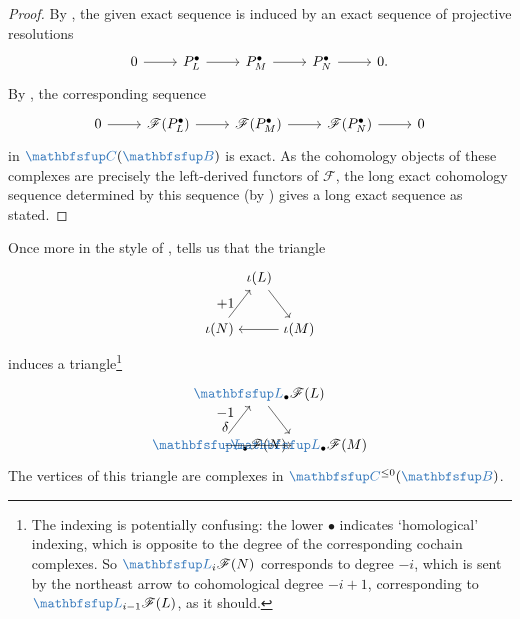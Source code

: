 \begin{proof}
  By , the given exact sequence is induced by
  an exact sequence of projective resolutions
  \[\begin{tikzcd}
      0 \arrow[r] & P_L^\bullet \arrow[r] & P_M^\bullet \arrow[r] &
      P_N^\bullet \arrow[r] & 0.
    \end{tikzcd}\] By , the corresponding
  sequence
  \[\begin{tikzcd}
      0 \arrow[r] & \mathscr{F}(P_L^\bullet) \arrow[r] &
      \mathscr{F}(P_M^\bullet) \arrow[r] & \mathscr{F}(P_N^\bullet)
      \arrow[r] & 0
    \end{tikzcd}\] in $\categ{C}(\categ{B})$ is exact. As the
  cohomology objects of these complexes are precisely the left-derived
  functors of $\mathscr{F}$, the long exact cohomology sequence
  determined by this sequence (by ) gives a long exact
  sequence as stated.
\end{proof}

Once more in the style of ,
 tells us that the triangle
\[
  \begin{tikzpicture}[baseline=(current bounding box.center)]
    \node (L) at (1,1.3)
    {$\iota(L)$}; \node (N) at (0,0)
    {$\iota(N)$}; \node (M) at (2,0)
    {$\iota(M)$}; \draw[->] (L) -- (M); \draw[->] (M) -- (N);
    \draw[->] (N) -- (L) node[midway, left] {$+1$};
  \end{tikzpicture}
\]
induces a triangle\footnote{The indexing is potentially confusing: the
  lower $\bullet$ indicates `homological' indexing, which is opposite
  to the degree of the corresponding cochain complexes. So
  $\categ{L}_i\mathscr{F}(N)$ corresponds to degree $-i$, which is
  sent by the northeast arrow to cohomological degree $-i+1$,
  corresponding to $\categ{L}_{i-1}\mathscr{F}(L)$, as it should.}
\[
  \begin{tikzpicture}[baseline=(current bounding box.center)]
    \node (L) at (1,1.3)
    {$\categ{L}_\bullet\mathscr{F}(L)$}; \node (N) at (0,0)
    {$\categ{L}_\bullet\mathscr{F}(N)$}; \node (M) at (2,0)
    {$\categ{L}_\bullet\mathscr{F}(M)$}; \draw[->] (L) -- (M);
    \draw[->] (M) -- (N); \draw[->] (N) -- (L) node[midway, left]
    {$\shortstack{$-1$ \\ $\delta$}$};
  \end{tikzpicture}
\]
The vertices of this triangle are complexes in
$\categ{C}^{\le 0} (\categ{B})$.

